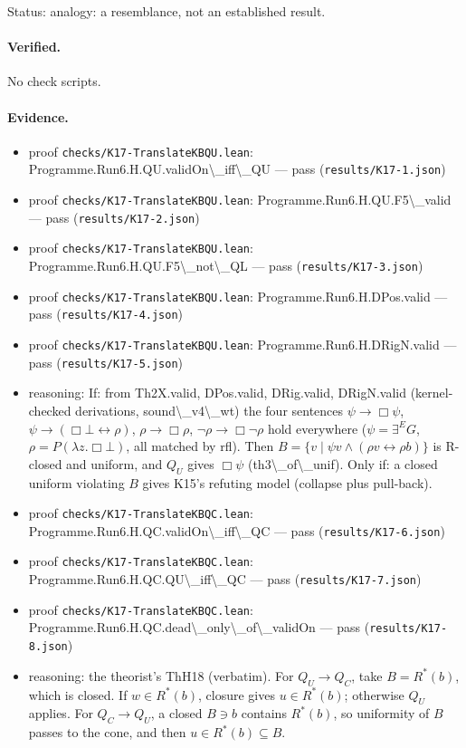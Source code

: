 \documentclass{article}
\begin{document}
Status: analogy: a resemblance, not an established result.

\paragraph{Verified.}
No check scripts.

\paragraph{Evidence.}
\begin{itemize}
\item proof \texttt{checks/K17-TranslateKBQU.lean}: Programme.Run6.H.QU.validOn\textbackslash{}\_iff\textbackslash{}\_QU --- pass (\texttt{results/K17-1.json})
\item proof \texttt{checks/K17-TranslateKBQU.lean}: Programme.Run6.H.QU.F5\textbackslash{}\_valid --- pass (\texttt{results/K17-2.json})
\item proof \texttt{checks/K17-TranslateKBQU.lean}: Programme.Run6.H.QU.F5\textbackslash{}\_not\textbackslash{}\_QL --- pass (\texttt{results/K17-3.json})
\item proof \texttt{checks/K17-TranslateKBQU.lean}: Programme.Run6.H.DPos.valid --- pass (\texttt{results/K17-4.json})
\item proof \texttt{checks/K17-TranslateKBQU.lean}: Programme.Run6.H.DRigN.valid --- pass (\texttt{results/K17-5.json})
\item reasoning: If: from Th2X.valid, DPos.valid, DRig.valid, DRigN.valid (kernel-checked derivations, sound\textbackslash{}\_v4\textbackslash{}\_wt) the four sentences $\psi\to\Box\psi$, $\psi\to(\Box\bot\leftrightarrow\rho)$, $\rho\to\Box\rho$, $\neg\rho\to\Box\neg\rho$ hold everywhere ($\psi=\exists^E G$, $\rho=P(\lambda z.\Box\bot)$, all matched by rfl). Then $B=\{v\mid\psi v\wedge(\rho v\leftrightarrow\rho b)\}$ is R-closed and uniform, and $Q_U$ gives $\Box\psi$ (th3\textbackslash{}\_of\textbackslash{}\_unif). Only if: a closed uniform violating $B$ gives K15's refuting model (collapse plus pull-back).
\item proof \texttt{checks/K17-TranslateKBQC.lean}: Programme.Run6.H.QC.validOn\textbackslash{}\_iff\textbackslash{}\_QC --- pass (\texttt{results/K17-6.json})
\item proof \texttt{checks/K17-TranslateKBQC.lean}: Programme.Run6.H.QC.QU\textbackslash{}\_iff\textbackslash{}\_QC --- pass (\texttt{results/K17-7.json})
\item proof \texttt{checks/K17-TranslateKBQC.lean}: Programme.Run6.H.QC.dead\textbackslash{}\_only\textbackslash{}\_of\textbackslash{}\_validOn --- pass (\texttt{results/K17-8.json})
\item reasoning: the theorist's ThH18 (verbatim). For $Q_U\to Q_C$, take $B=R^*(b)$, which is closed. If $w\in R^*(b)$, closure gives $u\in R^*(b)$; otherwise $Q_U$ applies. For $Q_C\to Q_U$, a closed $B\ni b$ contains $R^*(b)$, so uniformity of $B$ passes to the cone, and then $u\in R^*(b)\subseteq B$.
\end{itemize}
\end{document}
